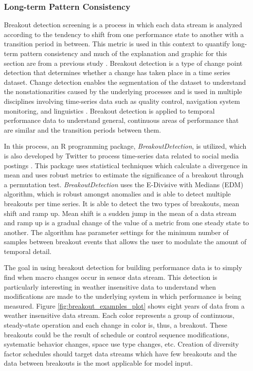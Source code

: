     \subsubsection{Long-term Pattern Consistency}
\label{sec:patternconsistency}

Breakout detection screening is a process in which each data stream is analyzed according to the tendency to shift from one performance state to another with a transition period in between. This metric is used in this context to quantify long-term pattern consistency and much of the explanation and graphic for this section are from a previous study \cite{miller_forensically_2015}. Breakout detection is a type of change point detection that determines whether a change has taken place in a time series dataset. Change detection enables the segmentation of the dataset to understand the nonstationarities caused by the underlying processes and is used in multiple disciplines involving time-series data such as quality control, navigation system monitoring, and linguistics \cite{basseville_detection_1993}. Breakout detection is applied to temporal performance data to understand general, continuous areas of performance that are similar and the transition periods between them.

In this process, an R programming package, \emph{BreakoutDetection}, is utilized, which is also developed by Twitter to process time-series data related to social media postings \cite{twitter_breakoutdetection_????}. This package uses statistical techniques which calculate a divergence in mean and uses robust metrics to estimate the significance of a breakout through a permutation test. \emph{BreakoutDetection} uses the E-Divisive with Medians (EDM) algorithm, which is robust amongst anomalies and is able to detect multiple breakouts per time series. It is able to detect the two types of breakouts, mean shift and ramp up. Mean shift is a sudden jump in the mean of a data stream and ramp up is a gradual change of the value of a metric from one steady state to another. The algorithm has parameter settings for the minimum number of samples between breakout events that allows the user to modulate the amount of temporal detail.

The goal in using breakout detection for building performance data is to simply find when macro changes occur in sensor data stream. This detection is particularly interesting in weather insensitive data to understand when modifications are made to the underlying system in which performance is being measured. Figure \ref{fig:breakout_examples_plot} shows eight years of data from a weather insensitive data stream. Each color represents a group of continuous, steady-state operation and each change in color is, thus, a breakout. These breakouts could be the result of schedule or control sequence modifications, systematic behavior changes, space use type changes, etc. Creation of diversity factor schedules should target data streams which have few breakouts and the data between breakouts is the most applicable for model input.